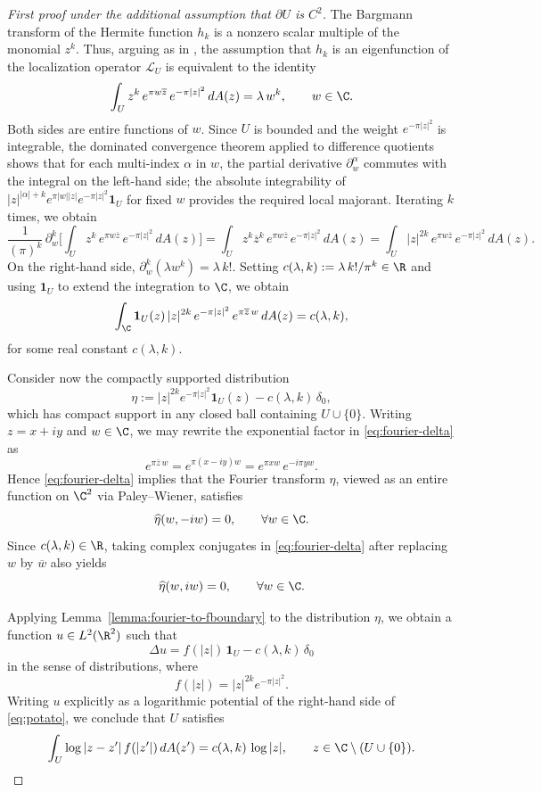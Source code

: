 \begin{proof}[First proof under the additional assumption that $\partial U$ is $C^2$]
The Bargmann transform of the Hermite function $h_k$ is a nonzero scalar
multiple of the monomial $z^k$. Thus, arguing as in
\cite{Abreu-Doerfler}, the assumption that $h_k$ is an eigenfunction of
the localization operator $\mathcal{L}_U$ is equivalent to the identity
\[
\int_U z^k\, e^{\pi w\overline{z}}\, e^{-\pi |z|^2}\,dA(z)
=\lambda\, w^k,
\qquad w\in \C.
\]
Both sides are entire functions of $w$. Since $U$ is bounded and the
weight $e^{-\pi|z|^2}$ is integrable, the dominated convergence
theorem applied to difference quotients shows that for each
multi-index $\alpha$ in $w$, the partial derivative
$\partial_w^\alpha$ commutes with the integral on the left-hand side;
the absolute integrability of $|z|^{|\alpha|+k} e^{\pi
|w||z|}e^{-\pi|z|^2}\mathbf{1}_U$ for fixed $w$ provides the required
local majorant. Iterating $k$ times, we obtain
\[
\frac{1}{(\pi)^k}\,\partial_w^k
\Big[\int_U z^k\, e^{\pi w\overline{z}}\, e^{-\pi |z|^2}\,dA(z)\Big]
=\int_U z^k\overline{z}^k\, e^{\pi w\overline{z}}\, e^{-\pi |z|^2}\,dA(z)
=\int_U |z|^{2k}\, e^{\pi w\overline{z}}\, e^{-\pi |z|^2}\,dA(z).
\]
On the right-hand side, $\partial_w^k(\lambda w^k)=\lambda\,k!$.
Setting $c(\lambda,k):=\lambda\,k!/\pi^k\in\R$ and using
$\mathbf{1}_U$ to extend the integration to $\C$, we obtain
\begin{equation}\label{eq:fourier-delta}
\int_{\C} \mathbf{1}_U(z)\,|z|^{2k}\,e^{-\pi |z|^2}\, e^{\pi \overline{z}\, w}\,dA(z)
=c(\lambda,k),
\end{equation}
for some real constant $c(\lambda,k)$.

Consider now the compactly supported distribution
\[
\eta:=|z|^{2k}e^{-\pi |z|^2}\mathbf{1}_U(z)-c(\lambda,k)\,\delta_0,
\]
which has compact support in any closed ball containing $U\cup\{0\}$.
Writing $z=x+iy$ and $w\in \C$, we may rewrite the exponential factor in
\eqref{eq:fourier-delta} as
\[
e^{\pi \overline{z}\, w}=e^{\pi(x-iy)w}=e^{\pi xw}\, e^{-i\pi yw}.
\]
Hence \eqref{eq:fourier-delta} implies that the Fourier transform
$\widehat{\eta}$, viewed as an entire function on $\C^2$ via Paley--Wiener,
satisfies
\[
\widehat{\eta}(w,-iw)=0,\qquad \forall w\in\C.
\]
Since $c(\lambda,k)\in \R$, taking complex conjugates in
\eqref{eq:fourier-delta} after replacing $w$ by $\overline{w}$ also yields
\[
\widehat{\eta}(w,iw)=0,\qquad \forall w\in\C.
\]

Applying Lemma~\ref{lemma:fourier-to-fboundary} to the distribution
$\eta$, we obtain a function $u\in L^2(\R^2)$ such that
\begin{equation}\label{eq:potato}
\Delta u=f(|z|)\,\mathbf{1}_U-c(\lambda,k)\,\delta_0
\end{equation}
in the sense of distributions, where
\[
f(|z|)=|z|^{2k}e^{-\pi |z|^2}.
\]
Writing $u$ explicitly as a logarithmic potential of the right-hand side
of \eqref{eq:potato}, we conclude that $U$ satisfies
\begin{equation}\label{eq:potential}
\int_U \log|z-z'|\, f(|z'|)\,dA(z')
=c(\lambda,k)\,\log|z|,
\qquad z\in \C\setminus (U\cup\{0\}).
\end{equation}


\end{proof}
